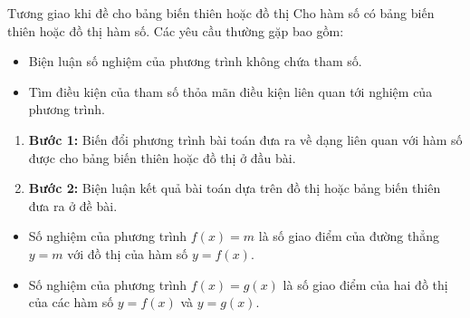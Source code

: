 \begin{dang}{Tương giao khi đề cho bảng biến thiên hoặc đồ thị}
    \baitoan Cho hàm số có bảng biến thiên hoặc đồ thị hàm số. Các yêu cầu thường gặp bao gồm:
    \begin{itemize}
        \item Biện luận số nghiệm của phương trình không chứa tham số.
        \item Tìm điều kiện của tham số thỏa mãn điều kiện liên quan tới nghiệm của phương trình.
    \end{itemize}
    \phuongphap
    \begin{enumerate}
        \item[] {\bf Bước 1:} Biến đổi phương trình bài toán đưa ra về dạng liên quan với hàm số được cho bảng biến thiên hoặc đồ thị ở đầu bài.
        \item[] {\bf Bước 2:} Biện luận kết quả bài toán dựa trên đồ thị hoặc bảng biến thiên đưa ra ở đề bài.
    \end{enumerate}
    \begin{note}
        \begin{itemize}
            \item Số nghiệm của phương trình $f(x)=m$ là số giao điểm của đường thẳng $y=m$ với đồ thị của hàm số $y=f(x)$.
            \item Số nghiệm của phương trình $f(x)=g(x)$ là số giao điểm của hai đồ thị của các hàm số $y=f(x)$ và $y=g(x)$.
        \end{itemize}
    \end{note}
\end{dang}
